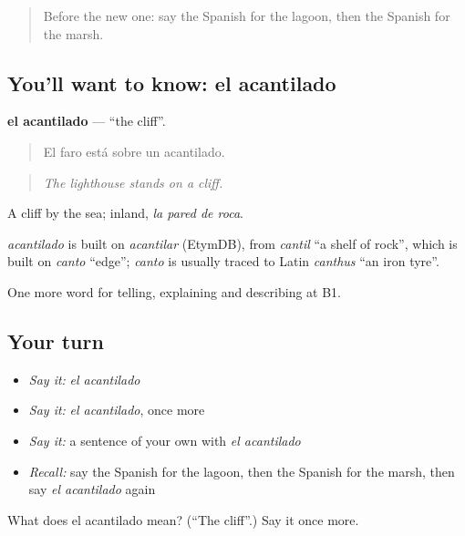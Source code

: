 \label{lesson:ES-C689-acantilado}



\begin{quote}
Before the new one: say the Spanish for the lagoon, then the Spanish for the marsh.
\end{quote}

\subsection*{You'll want to know: el acantilado}
\textbf{el acantilado} — \textquotedblleft{}the cliff\textquotedblright{}.

\begin{quote}
El faro está sobre un acantilado.
\end{quote}

\begin{quote}
\emph{The lighthouse stands on a cliff.}
\end{quote}

A cliff by the sea; inland, \emph{la pared de roca}.

\begin{cousinweb}
\emph{acantilado} is built on \emph{acantilar} (EtymDB), from \emph{cantil} \textquotedblleft{}a shelf of rock\textquotedblright{}, which is built on \emph{canto} \textquotedblleft{}edge\textquotedblright{}; \emph{canto} is usually traced to Latin \emph{canthus} \textquotedblleft{}an iron tyre\textquotedblright{}.
\end{cousinweb}

\begin{grammarlens}[title={What you've built}]
One more word for telling, explaining and describing at B1.
\end{grammarlens}

\subsection*{Your turn}
\begin{itemize}
\raggedright
  \item \emph{Say it:} \emph{el acantilado}
  \item \emph{Say it:} \emph{el acantilado}, once more
  \item \emph{Say it:} a sentence of your own with \emph{el acantilado}
  \item \emph{Recall:} say the Spanish for the lagoon, then the Spanish for the marsh, then say \emph{el acantilado} again
\end{itemize}

\begin{tcolorbox}[breakable,colback=teal!4,colframe=teal!35!black,title={Before you move on}]
What does el acantilado mean? (\textquotedblleft{}The cliff\textquotedblright{}.) Say it once more.
\end{tcolorbox}
